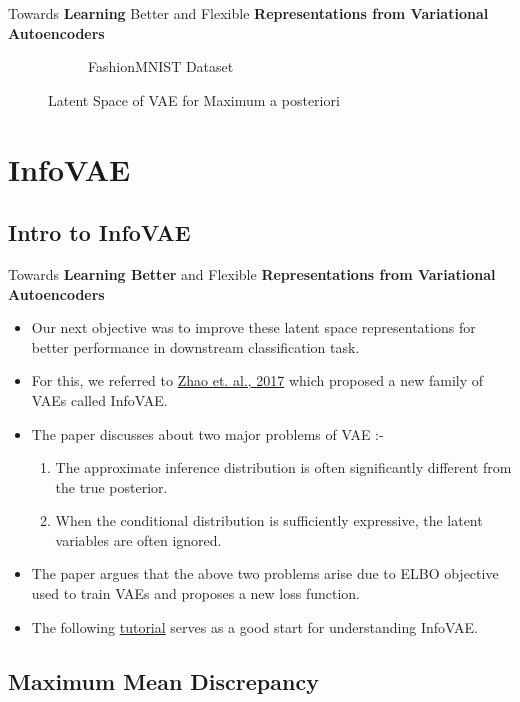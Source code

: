 \documentclass[hyperref={colorlinks,citecolor=blue,linkcolor=blue,urlcolor=blue}]{beamer}
\begin{document}
\begin{frame}{ Towards \textbf{Learning} Better and Flexible \textbf{Representations from Variational Autoencoders} \vspace{0.3em}}
\begin{figure}
\begin{subfigure}[b]{0.4\textwidth}
        \caption{FashionMNIST Dataset}
    \end{subfigure}
    \caption{Latent Space of VAE for Maximum a posteriori}
  \end{figure}
\end{frame}

\section{InfoVAE}
\subsection{Intro to InfoVAE}

\begin{frame}{ Towards \textbf{Learning Better} and Flexible \textbf{Representations from Variational Autoencoders} \vspace{0.3em}}
  \begin{itemize}
    \item Our next objective was to improve these latent space representations for better performance in downstream classification task.
    \item For this, we referred to \href{https://arxiv.org/pdf/1706.02262.pdf}{Zhao et. al., 2017} which proposed a new family of VAEs called InfoVAE.
    \item The paper discusses about two major problems of VAE :- 
    \begin{enumerate}
      \item The approximate inference distribution is often significantly different from the true posterior.
      \item When the conditional distribution is sufficiently expressive, the latent variables are often ignored.
    \end{enumerate}
    \item The paper argues that the above two problems arise due to ELBO objective used to train VAEs and proposes a new loss function.
    \item The following \href{https://ermongroup.github.io/blog/a-tutorial-on-mmd-variational-autoencoders/}{tutorial} serves as a good start for understanding InfoVAE. 
  \end{itemize}
\end{frame}

\subsection{Maximum Mean Discrepancy}
\end{document}
